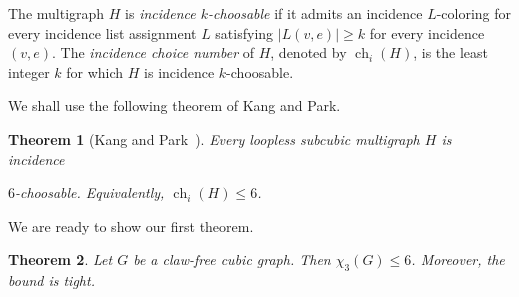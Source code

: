 \documentclass[10pt,a4paper]{article}
\newtheorem{theorem}             {Theorem}
\theoremstyle{case}
\numberwithin{subcase}{case}
\begin{document}
The multigraph $H$ is \emph{incidence $k$-choosable} if it admits an
incidence $L$-coloring for every incidence list assignment $L$
satisfying
$
    |L(v,e)|\geq k
$
for every incidence $(v,e)$. The \emph{incidence choice number} of $H$,
denoted by $\operatorname{ch}_{i}(H)$, is the least integer $k$ for
which $H$ is incidence $k$-choosable.

We shall use the following theorem of Kang and Park.

\begin{theorem}[Kang and Park~\cite{KangPark2019}]
\label{thm:kang-park}
Every loopless subcubic multigraph $H$ is incidence

$6$-choosable. Equivalently,
$    \operatorname{ch}_{i}(H)\leq 6$.
\end{theorem}

We are ready to show our first theorem.


\begin{theorem} \label{thm:clawfreeleq6}
Let $G$ be a claw-free cubic graph. Then $\chi_3(G)\leq 6$.
Moreover, the bound is tight.
\end{theorem}
\end{document}
